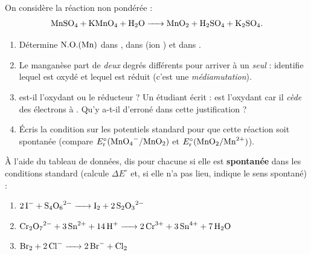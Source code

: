 \documentclass[11pt,a4paper]{article}
\newcommand{\NO}{\ensuremath{\mathrm{N.O.}}}
\newcommand{\Ered}{\ensuremath{E_{\mathrm{r}}^{\circ}}}
\newcounter{exo}
\begin{document}
\begin{exo}
On considère la réaction non pondérée :
\[
\ce{MnSO4 + KMnO4 + H2O -> MnO2 + H2SO4 + K2SO4}.
\]
\begin{enumerate}[label=\textbf{\alph*)},leftmargin=2.2em,topsep=2pt,itemsep=2pt]
  \item Détermine $\NO(\ce{Mn})$ dans , dans  (ion ) et dans .
  \item Le manganèse part de \emph{deux} degrés différents pour arriver à un \emph{seul} : identifie
        lequel est oxydé et lequel est réduit (c'est une \emph{médiamutation}).
  \item {} est-il l'oxydant ou le réducteur ? Un étudiant écrit : \og{} est l'oxydant
        car il \emph{cède} des électrons à \fg{}. Qu'y a-t-il d'erroné dans cette justification ?
  \item Écris la condition sur les potentiels standard pour que cette réaction soit spontanée
        (compare $\Ered(\ce{MnO4^-}/\ce{MnO2})$ et $\Ered(\ce{MnO2}/\ce{Mn^{2+}})$).
\end{enumerate}
\end{exo}

\begin{exo}
À l'aide du tableau de données, dis pour chacune si elle est \textbf{spontanée} dans les conditions
standard (calcule $\Delta E^{\circ}$ et, si elle n'a pas lieu, indique le sens spontané) :
\begin{enumerate}[label=\textbf{\alph*)},leftmargin=2.2em,topsep=2pt,itemsep=2pt]
  \item $\ce{2 I^- + S4O6^{2-} -> I2 + 2 S2O3^{2-}}$
  \item $\ce{Cr2O7^{2-} + 3 Sn^{2+} + 14 H+ -> 2 Cr^{3+} + 3 Sn^{4+} + 7 H2O}$
  \item $\ce{Br2 + 2 Cl^- -> 2 Br^- + Cl2}$
\end{enumerate}
\end{exo}
\end{document}
